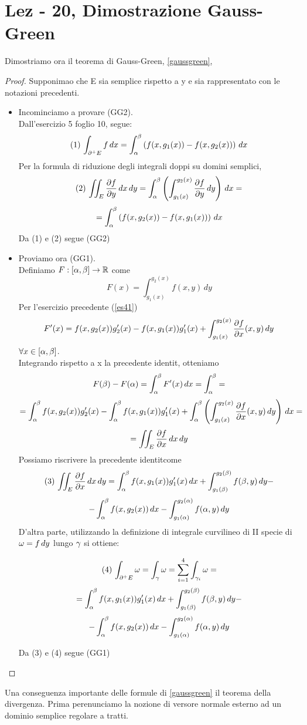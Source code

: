 \section{Lez - 20, Dimostrazione Gauss-Green}
Dimostriamo ora il teorema di Gauss-Green, \ref{gaussgreen},
\begin{proof}
  Supponimao che E sia semplice rispetto a y e sia rappresentato con le 
  notazioni precedenti. \\
  \begin{itemize}
    \item Incominciamo a provare (GG2). \\
          Dall'esercizio 5 foglio 10, segue:
          $$(1)\, \int_{\partial^+ E} f \, dx = \int_{\alpha}^{\beta}\left(f(x,g_1(x))-f(x,g_2(x))\right)\,dx$$
          Per la formula di riduzione degli integrali doppi su domini semplici, 
          $$(2)\, \iint_{E}\frac{\partial f}{\partial y} \,dx\,dy = \int_{\alpha}^{\beta}\left(\int_{g_1(x)}^{g_2(x)} \frac{\partial f}{\partial y} \,dy\right)\,dx = $$
          $$= \int_{\alpha}^{\beta} \left(f(x,g_2(x))-f(x,g_1(x))\right)\,dx$$
          Da (1) e (2) segue (GG2)
    \item Proviamo ora (GG1). \\
          Definiamo $F:[\alpha,\beta]\to\mathbb{R}$ come $$F(x) = \int_{g_1(x)}^{g_2(x)} f(x,y)\,dy$$
          Per l'esercizio precedente (\ref{es41}) 
          $$F'(x) = f(x,g_2(x))g_2'(x) - f(x,g_1(x))g_1'(x) + \int_{g_1(x)}^{g_2(x)} \frac{\partial f}{\partial x}(x,y)\,dy$$
          $\forall x \in [\alpha,\beta]$. \\
          Integrando rispetto a x la precedente identit\aca, otteniamo
          $$F(\beta)-F(\alpha) = \int_{\alpha}^{\beta} F'(x) \,dx = \int_{\alpha}^{\beta} = $$
          $$= \int_{\alpha}^{\beta} f(x,g_2(x))g_2'(x) - 
                \int_{\alpha}^{\beta} f(x,g_1(x))g_1'(x) + \int_{\alpha}^{\beta} \left(\int_{g_1(x)}^{g_2(x)} \frac{\partial f}{\partial x}(x,y)\,dy\right)\,dx = $$
          $$ = \iint_{E} \frac{\partial f}{\partial x}\,dx\,dy$$
          Possiamo riscrivere la precedente identit\aca come 
          $$(3)\, \iint_{E} \frac{\partial f}{\partial x} \,dx\,dy = \int_{\alpha}^{\beta} f(x,g_1(x))g_1'(x) \,dx + 
            \int_{g_1(\beta)}^{g_2(\beta)} f(\beta,y)\,dy - $$
            $$ - \int_{\alpha}^{\beta} f(x,g_2(x))\,dx - \int_{g_1(\alpha)}^{g_2(\alpha)} f(\alpha,y)\,dy$$
          D'altra parte, utilizzando la definizione di integrale curvilineo di 
          II specie di $\omega = f\,dy$ lungo $\gamma$ si ottiene:
          \begin{exercise}
            $$(4)\, \int_{\partial^+ E} \omega = \int_{\gamma} \omega = \sum_{i=1}^{4} \int_{\gamma_i}\omega =  $$
            $$= \int_{\alpha}^{\beta} f(x,g_1(x))g_1'(x) \,dx + 
            \int_{g_1(\beta)}^{g_2(\beta)} f(\beta,y)\,dy - $$
            $$ - \int_{\alpha}^{\beta} f(x,g_2(x))\,dx - \int_{g_1(\alpha)}^{g_2(\alpha)} f(\alpha,y)\,dy$$
          \end{exercise}
          Da (3) e (4) segue (GG1)
  \end{itemize}
\end{proof}
Una conseguenza importante delle formule di \ref{gaussgreen} \ace il teorema della divergenza. 
Prima per\aco enunciamo la nozione di versore normale esterno ad un dominio semplice 
regolare a tratti. 
